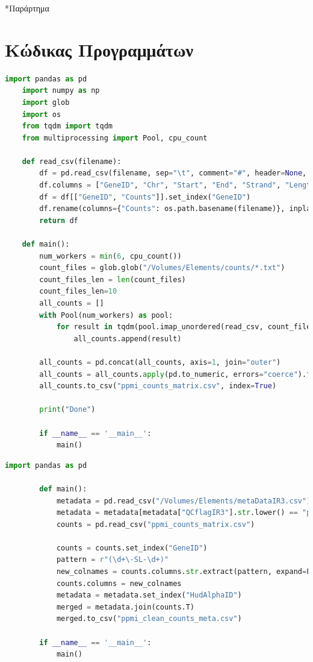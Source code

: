 \documentclass[12pt]{report}
\makeatletter
\let\oldchapter\chapter
\renewcommand{\chapter}{\@ifstar{\starchapter}{\nostarchapter}}
\newcommand{\starchapter}[1]{\oldchapter*{#1}\thispagestyle{mainstyle}}
\newcommand{\nostarchapter}[1]{\oldchapter{#1}\thispagestyle{mainstyle}}
\makeatother
\begin{document}
               

    \cleardoublepage
    \appendix
    \chapter*{Παράρτημα}
    
    \section*{Κώδικας Προγραμμάτων}\label{thesis:code}
    \begin{lstlisting}[language=Python,caption={read-data.py: Συκγρότηση CSV αρχείου με το σύνολο των δειγμάτων},label=lst:readdatapy]
    import pandas as pd
    import numpy as np
    import glob
    import os
    from tqdm import tqdm
    from multiprocessing import Pool, cpu_count
    
    def read_csv(filename):
        df = pd.read_csv(filename, sep="\t", comment="#", header=None, skiprows=1)
        df.columns = ["GeneID", "Chr", "Start", "End", "Strand", "Length", "Counts"]
        df = df[["GeneID", "Counts"]].set_index("GeneID")
        df.rename(columns={"Counts": os.path.basename(filename)}, inplace=True)
        return df
    
    def main():
        num_workers = min(6, cpu_count())
        count_files = glob.glob("/Volumes/Elements/counts/*.txt")
        count_files_len = len(count_files)
        count_files_len=10
        all_counts = []
        with Pool(num_workers) as pool:
            for result in tqdm(pool.imap_unordered(read_csv, count_files[1:10]), total=count_files_len, desc="Reading files"):
                all_counts.append(result)
    
        all_counts = pd.concat(all_counts, axis=1, join="outer")
        all_counts = all_counts.apply(pd.to_numeric, errors="coerce").fillna(0)
        all_counts.to_csv("ppmi_counts_matrix.csv", index=True)
    
        print("Done")

        if __name__ == '__main__':
            main()
    \end{lstlisting}
    \begin{lstlisting}[language=Python,caption={prepare-data.py: Εισαγωγή Metadata και φιλτράρισμα ακατάλληλων δειγμάτων},label=lst:preparedatapy]
        import pandas as pd
    
        def main():
            metadata = pd.read_csv("/Volumes/Elements/metaDataIR3.csv")
            metadata = metadata[metadata["QCflagIR3"].str.lower() == "pass"]
            counts = pd.read_csv("ppmi_counts_matrix.csv")
        
            counts = counts.set_index("GeneID")
            pattern = r"(\d+\-SL-\d+)"
            new_colnames = counts.columns.str.extract(pattern, expand=False)
            counts.columns = new_colnames
            metadata = metadata.set_index("HudAlphaID")
            merged = metadata.join(counts.T)
            merged.to_csv("ppmi_clean_counts_meta.csv")
        
        if __name__ == '__main__':
            main()
    \end{lstlisting}
\end{document}

